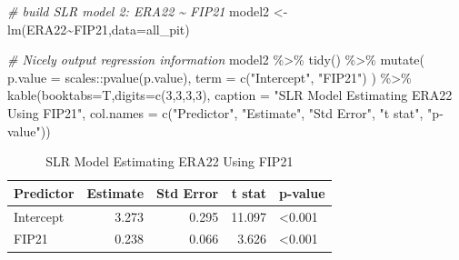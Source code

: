 \documentclass[
  11pt,
]{book}
\newenvironment{Shaded}{\begin{snugshade}}{\end{snugshade}}
\newcommand{\AttributeTok}[1]{\textcolor[rgb]{0.77,0.63,0.00}{#1}}
\newcommand{\CommentTok}[1]{\textcolor[rgb]{0.56,0.35,0.01}{\textit{#1}}}
\newcommand{\DecValTok}[1]{\textcolor[rgb]{0.00,0.00,0.81}{#1}}
\newcommand{\FunctionTok}[1]{\textcolor[rgb]{0.00,0.00,0.00}{#1}}
\newcommand{\NormalTok}[1]{#1}
\newcommand{\OtherTok}[1]{\textcolor[rgb]{0.56,0.35,0.01}{#1}}
\newcommand{\SpecialCharTok}[1]{\textcolor[rgb]{0.00,0.00,0.00}{#1}}
\newcommand{\StringTok}[1]{\textcolor[rgb]{0.31,0.60,0.02}{#1}}
\theoremstyle{definition}
\theoremstyle{definition}
\theoremstyle{definition}
\theoremstyle{definition}
\theoremstyle{remark}
\begin{document}
\newpage

\begin{Shaded}
\begin{Highlighting}[]
\CommentTok{\# build SLR model 2: ERA22 \textasciitilde{} FIP21}
\NormalTok{model2 }\OtherTok{\textless{}{-}} \FunctionTok{lm}\NormalTok{(ERA22}\SpecialCharTok{\textasciitilde{}}\NormalTok{FIP21,}\AttributeTok{data=}\NormalTok{all\_pit)}

\CommentTok{\# Nicely output regression information}
\NormalTok{model2 }\SpecialCharTok{\%\textgreater{}\%} \FunctionTok{tidy}\NormalTok{() }\SpecialCharTok{\%\textgreater{}\%}
  \FunctionTok{mutate}\NormalTok{(}
    \AttributeTok{p.value =}\NormalTok{ scales}\SpecialCharTok{::}\FunctionTok{pvalue}\NormalTok{(p.value),}
    \AttributeTok{term =} \FunctionTok{c}\NormalTok{(}\StringTok{"Intercept"}\NormalTok{, }\StringTok{"FIP21"}\NormalTok{)}
\NormalTok{  ) }\SpecialCharTok{\%\textgreater{}\%}
  \FunctionTok{kable}\NormalTok{(}\AttributeTok{booktabs=}\NormalTok{T,}\AttributeTok{digits=}\FunctionTok{c}\NormalTok{(}\DecValTok{3}\NormalTok{,}\DecValTok{3}\NormalTok{,}\DecValTok{3}\NormalTok{,}\DecValTok{3}\NormalTok{), }
        \AttributeTok{caption =} \StringTok{"SLR Model Estimating ERA22 Using FIP21"}\NormalTok{,}
        \AttributeTok{col.names =} \FunctionTok{c}\NormalTok{(}\StringTok{"Predictor"}\NormalTok{, }\StringTok{"Estimate"}\NormalTok{, }\StringTok{"Std Error"}\NormalTok{, }\StringTok{"t stat"}\NormalTok{, }\StringTok{"p{-}value"}\NormalTok{))}
\end{Highlighting}
\end{Shaded}

\begin{table}

\caption{\label{tab:unnamed-chunk-221}SLR Model Estimating ERA22 Using FIP21}
\centering
\begin{tabular}[t]{lrrrl}
\toprule
Predictor & Estimate & Std Error & t stat & p-value\\
\midrule
Intercept & 3.273 & 0.295 & 11.097 & <0.001\\
FIP21 & 0.238 & 0.066 & 3.626 & <0.001\\
\bottomrule
\end{tabular}
\end{table}
\end{document}
